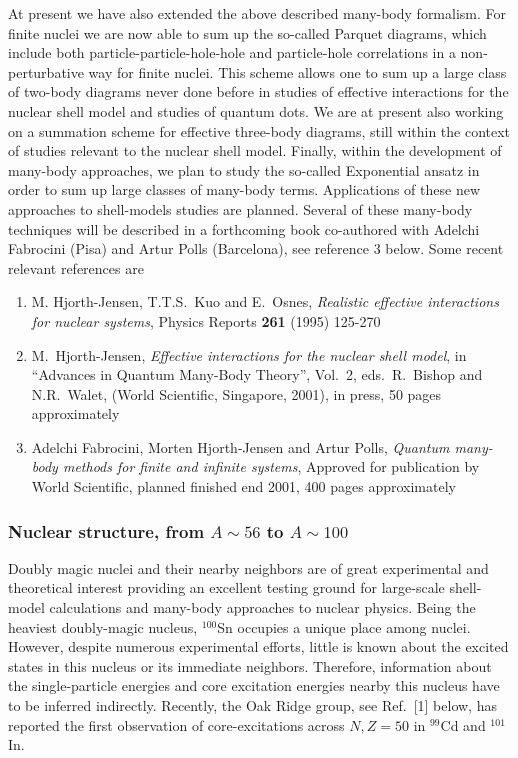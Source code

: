 At present we have also extended the above described many-body formalism.
For finite nuclei we are  now able to sum 
up the so-called Parquet diagrams, which include both
particle-particle-hole-hole and particle-hole correlations
in a non-perturbative way for finite nuclei. 
This scheme allows one to sum up a large class of two-body
diagrams never done before in studies of effective interactions
for the nuclear shell model and studies of quantum dots. 
We are  at present also working on a summation scheme for 
effective three-body diagrams, still within the context
of studies relevant to the nuclear shell model. 
Finally, within the development of many-body approaches,
we plan to study the so-called Exponential ansatz in order
to sum up large classes of many-body terms.
Applications of these new approaches to shell-models
studies are planned.
Several of these many-body techniques will be described  in 
a forthcoming book co-authored with Adelchi Fabrocini (Pisa)
and Artur Polls (Barcelona), see reference 3 below.
\newline\newline
Some recent relevant references are
\begin{enumerate}
\item
    M. Hjorth-Jensen, T.T.S.\ Kuo and E.\ Osnes,
    {\em Realistic effective interactions for nuclear systems},
    Physics Reports {\bf 261} (1995) 125-270
\item M.\ Hjorth-Jensen, {\em Effective interactions
for the nuclear shell model},
in ``Advances in Quantum Many-Body Theory'',
Vol.\ 2, eds.\ R.\ Bishop and N.R.\ Walet, 
(World Scientific, Singapore, 2001), in press, 50 pages approximately
\item Adelchi Fabrocini, Morten Hjorth-Jensen and Artur Polls, 
{\em Quantum many-body methods for finite and infinite systems},
Approved for publication by World Scientific, 
planned finished end 2001, 400 pages
approximately
\end{enumerate}


\subsubsection{Nuclear structure, from $A\sim 56$ to $A\sim 100$}
Doubly magic nuclei and their nearby neighbors are of great 
experimental and theoretical interest providing an excellent
testing ground for large-scale shell-model calculations and
many-body approaches to nuclear physics. Being the heaviest
doubly-magic nucleus, $^{100}$Sn occupies a unique place
among nuclei. However, despite numerous experimental
efforts, little is known about the excited states in this nucleus
or its immediate neighbors. Therefore, information about the 
single-particle energies and core excitation energies nearby
this nucleus have to be inferred indirectly. Recently, the 
Oak Ridge group, see Ref.~[1] below, has reported the first
observation of core-excitations across $N,Z=50$ in $^{99}$Cd and
$^{101}$In. 


